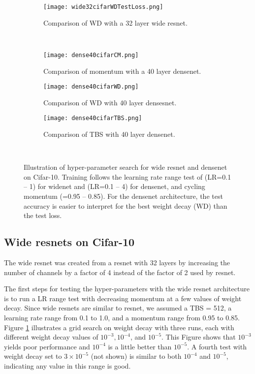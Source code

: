 \documentclass{article} %
\begin{document}
\begin{figure}[tbh]
	\centering
	\begin{subfigure}[b]{0.46\textwidth}
		\texttt{[image: wide32cifarWDTestLoss.png]}
		\caption{Comparison of WD with a 32 layer wide resnet.}
		\label{fig:wide32cifarWDTestLoss}       %
	\end{subfigure}
	\hfill
	~ %
	\centering
	\begin{subfigure}[b]{0.46\textwidth}
		\texttt{[image: dense40cifarCM.png]}
		\caption{Comparison of momentum with a 40 layer densenet. }
		\label{fig:dense40cifarCM}       %
	\end{subfigure}
	\quad
	\hfill
	\centering
	\begin{subfigure}[b]{0.46\textwidth}
		\texttt{[image: dense40cifarWD.png]}
		\caption{Comparison of WD with 40 layer densesnet.}
		\label{fig:dense40cifarWD}       %
	\end{subfigure}
	\hfill
	\centering
	\begin{subfigure}[b]{0.46\textwidth}
		\texttt{[image: dense40cifarTBS.png]}
		\caption{Comparison of TBS with 40 layer densenet. }
		\label{fig:dense40cifarTBS}       %
	\end{subfigure}
	~ %
	\caption{Illustration of hyper-parameter search for wide resnet and densenet on Cifar-10.  Training follows the learning rate range test  of (LR=0.1 -- 1) for widenet and (LR=0.1 -- 4) for densenet, and cycling momentum (=0.95 -- 0.85).  For the densenet architecture, the test accuracy is easier to interpret for the best weight decay (WD)  than the test loss.}
	\label{fig:WideDensenet}
	\vspace{-5pt}	
\end{figure}

\subsection{Wide resnets on Cifar-10}
\label{sec:wide}

The wide resnet was created from a resnet with 32 layers by increasing the number of channels by a factor of 4 instead of the factor of 2 used by resnet.  

The first steps for testing the hyper-parameters with the wide resnet architecture is to run a LR range test with decreasing momentum at a few values of weight decay.  Since wide resnets are similar to resnet, we assumed a TBS = 512, a learning rate range from 0.1 to 1.0, and a momentum range from 0.95 to 0.85.  Figure \ref{fig:wide32cifarWDTestLoss} illustrates a grid search on weight decay with three runs, each with different weight decay values of $10^{-3}, 10^{-4}$, and $10^{-5}$.  This Figure shows that $10^{-3}$ yields poor performance and $10^{-4}$ is a little better than $10^{-5}$.  A fourth test with weight decay set to $3 \times 10^{-5}$ (not shown) is similar to both $10^{-4}$ and $10^{-5}$, indicating any value in this range is good.
\end{document}
